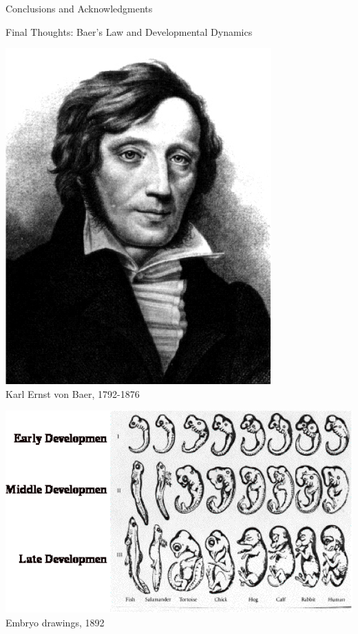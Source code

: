 \documentclass[10pt]{beamer}
\begin{document}
\begin{frame}{Conclusions and Acknowledgments}
\end{frame}

\begin{frame}{Final Thoughts: Baer's Law and Developmental Dynamics}

\begin{minipage}{0.3\textwidth}
\centering
\includegraphics[width=\textwidth]{vonbaer} \\
Karl Ernst von Baer, 1792-1876
\end{minipage}
\hfill
\begin{minipage}{0.65\textwidth}
\centering
\includegraphics[width=\textwidth]{stages_development}\\
Embryo drawings, 1892
\end{minipage}

\end{frame}
\end{document}
